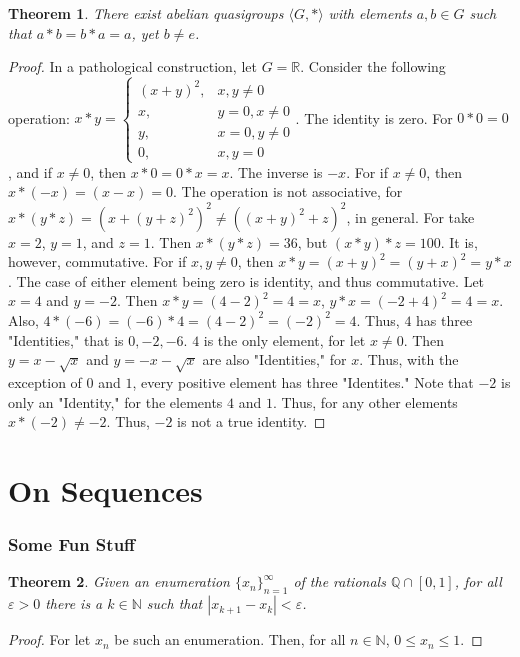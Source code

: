 \documentclass[oneside]{book}
\newtheorem{theorem}{Theorem}[section]
\theoremstyle{definition}
\begin{document}
\begin{theorem}
There exist abelian quasigroups $\langle G,*\rangle$ with elements $a,b\in G$ such that $a*b = b*a = a$, yet $b\ne e$.
\end{theorem}
\begin{proof}
In a pathological construction, let $G=\mathbb{R}$. Consider the following operation:
$x* y = \begin{cases} (x+y)^2, & x,y\ne 0 \\ x, & y=0,x\ne 0 \\ y, & x=0,y\ne 0 \\ 0, & x,y=0 \end{cases}$.
The identity is zero. For $0*0 = 0$, and if $x\ne 0$, then $x*0 = 0*x = x$. The inverse is $-x$. For if $x\ne 0$, then $x*(-x) = (x-x)=0$. The operation is not associative, for $x*(y*z) = (x+(y+z)^2)^2 \ne ((x+y)^2+z)^2$, in general. For take $x=2$, $y=1$, and $z=1$. Then $x*(y*z) = 36$, but $(x*y)*z = 100$. It is, however, commutative. For if $x,y \ne 0$, then $x*y = (x+y)^2 = (y+x)^2 = y*x$. The case of either element being zero is identity, and thus commutative. Let $x=4$ and $y=-2$. Then $x*y = (4-2)^2 = 4=x$, $y*x = (-2+4)^2 = 4 = x$. Also, $4*(-6) = (-6)*4 = (4-2)^2 = (-2)^2 = 4$. Thus, $4$ has three "Identities," that is $0,-2,-6$. $4$ is the only element, for let $x \ne 0$. Then $y = x-\sqrt{x}$ and $y=-x-\sqrt{x}$ are also "Identities," for $x$. Thus, with the exception of $0$ and $1$, every positive element has three "Identites." Note that $-2$ is only an "Identity," for the elements $4$ and $1$. Thus, for any other elements $x*(-2) \ne -2$. Thus, $-2$ is not a true identity.
\end{proof}

\section{On Sequences}

\subsubsection{Some Fun Stuff}

\begin{theorem}
Given an enumeration $\{x_n\}_{n=1}^{\infty}$ of the rationals $\mathbb{Q}\cap [0,1]$, for all $\varepsilon>0$ there is a $k\in \mathbb{N}$ such that $|x_{k+1}-x_k|<\varepsilon$.
\end{theorem}
\begin{proof}
For let $x_n$ be such an enumeration. Then, for all $n\in \mathbb{N}$, $0 \leq x_n \leq 1$.
\end{proof}
\end{document}
